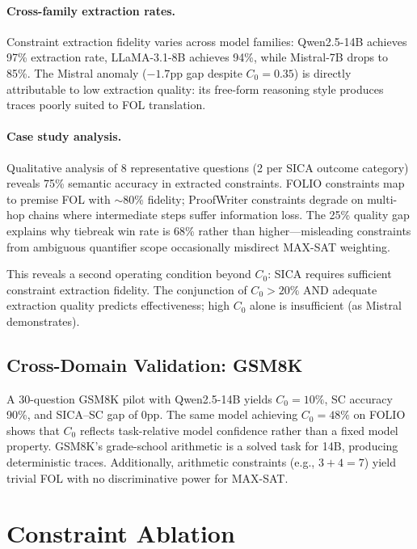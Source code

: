 \documentclass[11pt,a4paper]{article}
\begin{document}
\paragraph{Cross-family extraction rates.} Constraint extraction fidelity varies across model families: Qwen2.5-14B achieves 97\% extraction rate, LLaMA-3.1-8B achieves 94\%, while Mistral-7B drops to 85\%. The Mistral anomaly ($-1.7$pp gap despite $C_0=0.35$) is directly attributable to low extraction quality: its free-form reasoning style produces traces poorly suited to FOL translation.

\paragraph{Case study analysis.} Qualitative analysis of 8 representative questions (2 per SICA outcome category) reveals 75\% semantic accuracy in extracted constraints. FOLIO constraints map to premise FOL with $\sim$80\% fidelity; ProofWriter constraints degrade on multi-hop chains where intermediate steps suffer information loss. The 25\% quality gap explains why tiebreak win rate is 68\% rather than higher---misleading constraints from ambiguous quantifier scope occasionally misdirect MAX-SAT weighting.

This reveals a second operating condition beyond $C_0$: SICA requires sufficient constraint extraction fidelity. The conjunction of $C_0 > 20\%$ AND adequate extraction quality predicts effectiveness; high $C_0$ alone is insufficient (as Mistral demonstrates).

\subsection{Cross-Domain Validation: GSM8K}

A 30-question GSM8K pilot with Qwen2.5-14B yields $C_0=10\%$, SC accuracy 90\%, and SICA--SC gap of 0pp. The same model achieving $C_0=48\%$ on FOLIO shows that $C_0$ reflects task-relative model confidence rather than a fixed model property. GSM8K's grade-school arithmetic is a solved task for 14B, producing deterministic traces. Additionally, arithmetic constraints (e.g., $3+4=7$) yield trivial FOL with no discriminative power for MAX-SAT.

\section{Constraint Ablation}
\label{sec:ablation}
\end{document}
